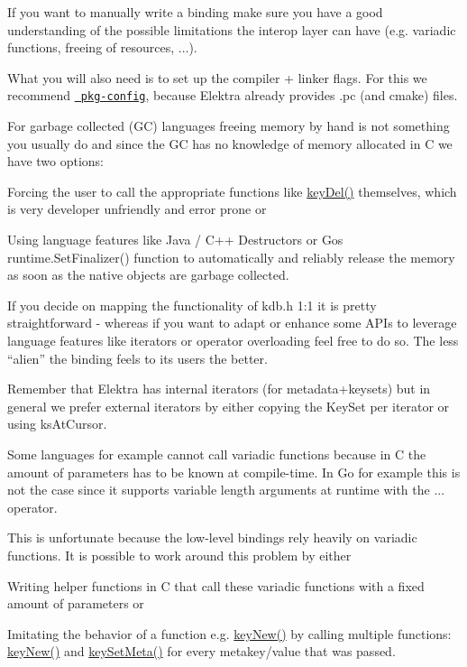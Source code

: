 If you want to manually write a binding make sure you have a good understanding of the possible limitations the interop layer can have (e.\+g. variadic functions, freeing of resources, ...).

What you will also need is to set up the compiler + linker flags. For this we recommend \href{https://www.freedesktop.org/wiki/Software/pkg-config/}{\texttt{ pkg-\/config}}, because Elektra already provides {\ttfamily .pc} (and {\ttfamily cmake}) files.

For garbage collected (GC) languages freeing memory by hand is not something you usually do and since the GC has no knowledge of memory allocated in C we have two options\+:


\begin{DoxyItemize}
\item Forcing the user to call the appropriate functions like {\ttfamily \mbox{\hyperlink{group__key_ga3df95bbc2494e3e6703ece5639be5bb1}{key\+Del()}}} themselves, which is very developer unfriendly and error prone or
\item Using language features like Java / C++ Destructors or Go\textquotesingle{}s {\ttfamily runtime.\+Set\+Finalizer()} function to automatically and reliably release the memory as soon as the native objects are garbage collected.
\end{DoxyItemize}

If you decide on mapping the functionality of kdb.h 1\+:1 it is pretty straightforward -\/ whereas if you want to adapt or enhance some A\+PI\textquotesingle{}s to leverage language features like iterators or operator overloading feel free to do so. The less “alien” the binding feels to its users the better.

Remember that Elektra has internal iterators (for metadata+keysets) but in general we prefer external iterators by either copying the Key\+Set per iterator or using {\ttfamily ks\+At\+Cursor}.

Some languages for example cannot call variadic functions because in C the amount of parameters has to be known at compile-\/time. In Go for example this is not the case since it supports variable length arguments at runtime with the {\ttfamily ...} operator.

This is unfortunate because the low-\/level bindings rely heavily on variadic functions. It is possible to work around this problem by either


\begin{DoxyEnumerate}
\item Writing helper functions in C that call these variadic functions with a fixed amount of parameters or
\item Imitating the behavior of a function e.\+g. {\ttfamily \mbox{\hyperlink{group__key_gad23c65b44bf48d773759e1f9a4d43b89}{key\+New()}}} by calling multiple functions\+: {\ttfamily \mbox{\hyperlink{group__key_gad23c65b44bf48d773759e1f9a4d43b89}{key\+New()}}} and {\ttfamily \mbox{\hyperlink{group__keymeta_gae1f15546b234ffb6007d8a31178652b9}{key\+Set\+Meta()}}} for every metakey/value that was passed.
\end{DoxyEnumerate}

